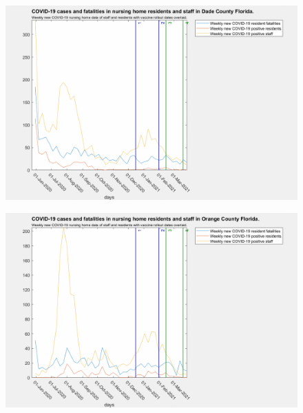 \documentclass[twoside]{article}
\begin{document}
\begin{multicols}{2}
\begin{figure}[H]
	\includegraphics[width=\linewidth]{images/dade_nursing_home_with_vaccine.png}
	\caption{}
	\label{fig:images/dade_nursing_home_with_vaccineLabel}
\end{figure}

\begin{figure}[H]
	\includegraphics[width=\linewidth]{images/orange_nursing_home_with_vaccine.png}
	\caption{}
	\label{fig:images/orange_nursing_home_with_vaccineLabel}
\end{figure}


\end{multicols}
\end{document}
